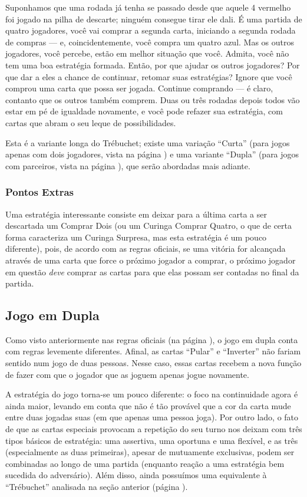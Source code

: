 Suponhamos que uma rodada já tenha se passado desde que aquele 4 vermelho foi jogado na pilha de descarte; ninguém consegue tirar ele dali. É uma partida de quatro jogadores, você vai comprar a segunda carta, iniciando a segunda rodada de compras --- e, coincidentemente, você compra um quatro azul. Mas os outros jogadores, você percebe, estão em melhor situação que você. Admita, você não tem uma boa estratégia formada. Então, por que ajudar os outros jogadores? Por que dar a eles a chance de continuar, retomar suas estratégias? Ignore que você comprou uma carta que possa ser jogada. Continue comprando --- é claro, contanto que os outros também comprem. Duas ou três rodadas depois todos vão estar em pé de igualdade novamente, e você pode refazer sua estratégia, com cartas que abram o seu leque de possibilidades.

Esta é a variante longa do Trébuchet; existe uma variação ``Curta'' (para jogos apenas com dois jogadores, vista na página \pageref{trebuchetcurto}) e uma variante ``Dupla'' (para jogos com parceiros, vista na página \pageref{trebuchetduplo}), que serão abordadas mais adiante.

\subsubsection{Pontos Extras}

Uma estratégia interessante consiste em deixar para a última carta a ser descartada um Comprar Dois (ou um Curinga Comprar Quatro, o que de certa forma caracteriza um Curinga Surpresa, mas esta estratégia é um pouco diferente), pois, de acordo com as regras oficiais, se uma vitória for alcançada através de uma carta que force o próximo jogador a comprar, o próximo jogador em questão \emph{deve} comprar as cartas para que elas possam ser contadas no final da partida.

\subsection{Jogo em Dupla}

Como visto anteriormente nas regras oficiais (na página \pageref{oficiais}), o jogo em dupla conta com regras levemente diferentes. Afinal, as cartas ``Pular'' e ``Inverter'' não fariam sentido num jogo de duas pessoas. Nesse caso, essas cartas recebem a nova função de fazer com que o jogador que as joguem apenas jogue novamente.

A estratégia do jogo torna-se um pouco diferente: o foco na continuidade agora é ainda maior, levando em conta que não é tão provável que a cor da carta mude entre duas jogadas suas (em que apenas uma pessoa joga). Por outro lado, o fato de que as cartas especiais provocam a repetição do seu turno nos deixam com três tipos básicos de estratégia: uma assertiva, uma oportuna e uma flexível, e as três (especialmente as duas primeiras), apesar de mutuamente exclusivas, podem ser combinadas ao longo de uma partida (enquanto reação a uma estratégia bem sucedida do adversário). Além disso, ainda possuímos uma equivalente à ``Trébuchet'' analisada na seção anterior (página \pageref{trebuchetlongo}).

